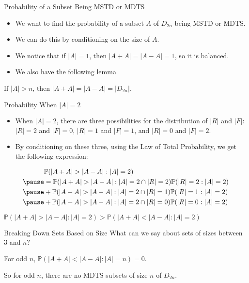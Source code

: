 \documentclass{beamer}
\newcommand{\bi}{\begin{itemize}}
\newcommand{\ei}{\end{itemize}}
\newcommand{\pr}{\mathbb{P}}
\begin{document}
\begin{frame}{Probability of a Subset Being MSTD or MDTS}
\bi
	\item We want to find the probability of a subset $A$ of $D_{2n}$ being MSTD or MDTS.
		\medskip
		\pause
	\item We can do this by conditioning on the size of $A$.
		\medskip
		\pause
	\item We notice that if $|A|=1$, then $|A+A|=|A-A|=1$, so it is balanced.
		\medskip
		\pause
	\item We also have the following lemma 
\ei
\medskip
\begin{lemma}[SMALL 2020]
	If $|A| > n$, then $|A+A|=|A-A|=|D_{2n}|$.
\end{lemma}
\end{frame}

\begin{frame}{Probability When $|A| = 2$}
\bi
	\item When $|A| = 2$, there are three possibilities for the distribution of $|R|$ and $|F|$: $|R|=2$ and $|F|=0$, $|R|=1$ and $|F|=1$, and $|R|=0$ and $|F|=2$.
		\medskip
		\pause
	\item By conditioning on these three, using the Law of Total Probability, we get the following expression:
\ei
\pause
\begin{align*}
	&\pr(|A+A|>|A-A|:|A|=2)\\
	\pause
	&= \pr(|A+A|>|A-A|:|A|=2 \cap |R|=2)\pr(|R|=2:|A|=2)\\
	\pause
	&+ \pr(|A+A|>|A-A|:|A|=2 \cap |R|=1)\pr(|R|=1:|A|=2)\\
	\pause
	&+ \pr(|A+A|>|A-A|:|A|=2 \cap |R|=0)\pr(|R|=0:|A|=2)
\end{align*}
\pause
\vspace{-0.5\baselineskip}
\begin{lemma}[SMALL 2020]
	$\pr(|A+A| > |A-A| : |A| = 2) > \pr(|A+A| < |A-A| : |A| = 2)$
\end{lemma}
\end{frame}

\begin{frame}{Breaking Down Sets Based on Size}
What can we say about sets of sizes between $3$ and $n$?

\medskip
\pause
\begin{lemma}[SMALL 2020]
	For odd $n$, $\pr(|A+A| < |A-A|: |A| = n) = 0$.
\end{lemma}

\medskip

So for odd $n$, there are no MDTS subsets of size $n$ of $D_{2n}$. 
\end{frame}
\end{document}
